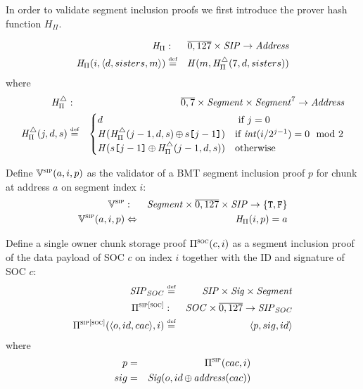 In order to validate segment inclusion proofs we first introduce the prover hash function $\mathit{H}_{\Pi}$.

\begin{definition}
\label{def:prover-function}
%
\begin{eqnarray}
\mathit{H}_{\Pi}&:&\overline{0,127}\times\mathit{SIP}\to\mathit{Address}\\
\mathit{H}_{\Pi}(i,\langle d, sisters, m\rangle)&\overset{\textrm{\tiny def}}{=}&\mathit{H}(m,\mathit{H}_{\Pi}^{\triangle}(7,d,sisters))
\end{eqnarray}
%
where
%
\begin{eqnarray}
\mathit{H}_{\Pi}^{\triangle}&:&\overline{0,7}\times\mathit{Segment}\times\mathit{Segment}^7\to\mathit{Address}\\
\mathit{H}_{\Pi}^{\triangle}(j,d,s)&\overset{\textrm{\tiny def}}{=}& \begin{cases}
d & \text{ if } j=0\\
\mathit{H}(\mathit{H}_{\Pi}^{\triangle}(j-1,d,s)\operatorname{\operatorname{\oplus}} s\texttt{[}\/j-1\/\texttt{]}) & \text{if }\mathit{int}(i/2^{j-1}) = 0 \mod 2\\
\mathit{H}(s\texttt{[}\/j-1\/\texttt{]}\operatorname{\operatorname{\oplus}} \mathit{H}_{\Pi}^{\triangle}(j-1,d,s)) &\text{otherwise}
\end{cases}
\end{eqnarray}
\end{definition}


\begin{definition}
\label{def:sip-validation}
Define  $\mathbb{V}^{\textsc{sip}}(a, i, p)$ as the validator of a BMT segment inclusion proof $p$ for chunk at address $a$ on segment index $i$:
%
\begin{eqnarray}
\mathbb{V}^{\textsc{sip}}&:&\mathit{Segment}\times\overline{0,127}\times \mathit{SIP} \to \{\mathtt{T,F}\}
\\
\mathbb{V}^{\textsc{sip}}(a,i,p) &\Leftrightarrow&
\mathit{H}_{\Pi}(i,p)=a
\end{eqnarray}
\end{definition}

\begin{definition}
\label{def:socproof}
Define a single owner chunk storage proof $\Pi^{\textsc{soc}}(c,i)$ as a segment inclusion proof of the data payload of SOC $c$ on index $i$ together with the ID and signature of SOC $c$:
%
\begin{eqnarray}
\mathit{SIP}_\mathit{SOC} &\overset{\textrm{\tiny def}}{=}&\mathit{SIP}\times\mathit{Sig}\times\mathit{Segment}\\
\Pi^{\textsc{sip[soc]}} &:&\mathit{SOC}\times\overline{0,127}\to\mathit{SIP}_\mathit{SOC}\\ 
\Pi^{\textsc{sip[soc]}}(\langle o,id,cac\rangle,i)&\overset{\textrm{\tiny def}}{=}&  \langle p, sig, id\rangle
\end{eqnarray}
%
where
%
\begin{eqnarray}
p&=&\Pi^{\textsc{sip}}(cac,i)\\
sig&=&\mathit{Sig}(o,id\operatorname{\operatorname{\oplus}} \mathit{address}(cac))
\end{eqnarray}
\end{definition}

